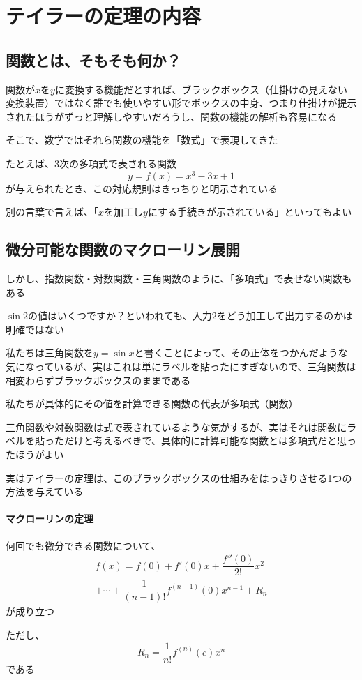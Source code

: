 \documentclass[../book_infinite_continuous_math]{subfiles}
\begin{document}
\section{テイラーの定理の内容}

\subsection{関数とは、そもそも何か？}

関数が$x$を$y$に変換する機能だとすれば、ブラックボックス（仕掛けの見えない変換装置）ではなく誰でも使いやすい形でボックスの中身、つまり仕掛けが提示されたほうがずっと理解しやすいだろうし、関数の機能の解析も容易になる

そこで、数学ではそれら関数の機能を「数式」で表現してきた

\br

たとえば、3次の多項式で表される関数
\begin{equation*}
  y = f(x) = x^3 - 3x + 1
\end{equation*}
が与えられたとき、この対応規則はきっちりと明示されている

別の言葉で言えば、「$x$を加工し$y$にする手続きが示されている」といってもよい

\sectionline
\subsection{微分可能な関数のマクローリン展開}

しかし、指数関数・対数関数・三角関数のように、「多項式」で表せない関数もある

$\sin 2$の値はいくつですか？といわれても、入力$2$をどう加工して出力するのかは明確ではない

私たちは三角関数を$y=\sin x$と書くことによって、その正体をつかんだような気になっているが、実はこれは単にラベルを貼ったにすぎないので、三角関数は相変わらずブラックボックスのままである

\br

私たちが具体的にその値を計算できる関数の代表が多項式（関数）

三角関数や対数関数は式で表されているような気がするが、実はそれは関数にラベルを貼っただけと考えるべきで、具体的に計算可能な関数とは多項式だと思ったほうがよい

\br

実はテイラーの定理は、このブラックボックスの仕組みをはっきりさせる1つの方法を与えている

\begin{oframed}
  \paragraph{マクローリンの定理}
  何回でも微分できる関数について、
  \begin{multline*}
    f(x) = f(0) + f'(0)x + \dfrac{f''(0)}{2!}x^2 \\ + \cdots + \dfrac{1}{(n-1)!}f^{(n-1)}(0)x^{n-1} + R_n
  \end{multline*}
  が成り立つ

  ただし、
  \begin{equation*}
    R_n = \dfrac{1}{n!}f^{(n)}(c)x^n
  \end{equation*}
  である
\end{oframed}
\end{document}
